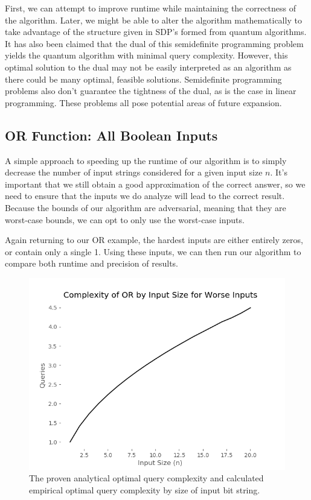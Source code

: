 First, we can attempt to improve runtime while
maintaining the correctness of the algorithm. Later,
we might be able to alter the algorithm
mathematically to take advantage of the structure
given in SDP's formed from quantum algorithms. 
It has also been claimed that the dual of this semidefinite
programming problem yields the quantum algorithm with minimal query complexity.
However, this optimal solution to the dual may not be easily 
interpreted as an algorithm as there could be many optimal, feasible solutions. 
Semidefinite programming problems also don't guarantee the tightness of the dual,
as is the case in linear programming. 
These problems all pose potential areas of future expansion.

\subsection{OR Function: All Boolean Inputs}

A simple approach to speeding up the runtime of our
algorithm is to simply decrease the number of input
strings considered for a given input size $n$. It's
important that we still obtain a good approximation
of the correct answer, so we need to ensure that the
inputs we do analyze will lead to the correct result.
Because the bounds of our algorithm are adversarial,
meaning that they are worst-case bounds, we can opt
to only use the worst-case inputs.

Again returning to our OR example, the hardest inputs are
either entirely zeros, or contain only a single 1. 
Using these inputs, we can then run our algorithm to 
compare both runtime and precision of results.

\begin{figure}[ht]
\centering
\includegraphics[scale=.5]{figures/or_worst_complexity.png}
\caption{The proven analytical optimal query complexity
and calculated empirical optimal query complexity by 
size of input bit string.}
\label{fig:or_worst_complexity}
\end{figure}

